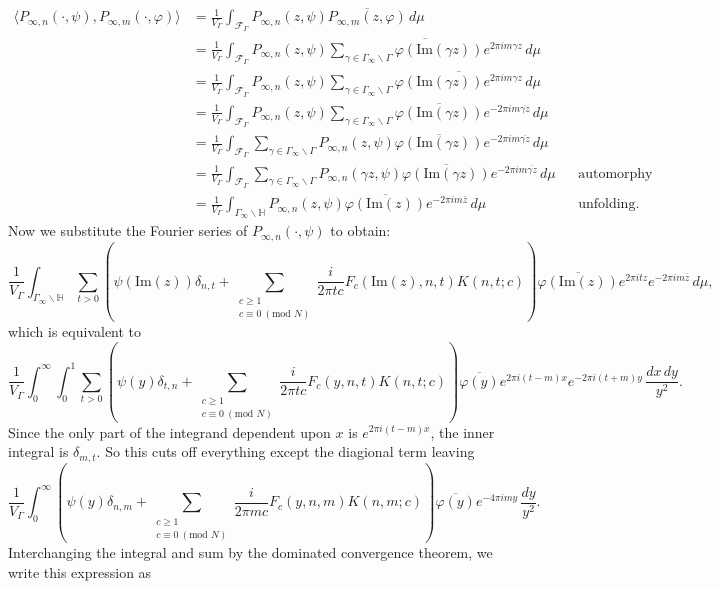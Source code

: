 \documentclass[12pt]{book}
\theoremstyle{definition}\newframedtheorem{method}{Method}
\newcommand{\tmod}[1]{\ \left(\text{mod }#1\right)}
\newcommand{\mc}{\mathcal}
\renewcommand{\H}{\mathbb{H}}
\newcommand{\g}{\gamma}
\renewcommand{\d}{\delta}
\newcommand{\G}{\Gamma}
\newcommand{\vphi}{\varphi}
\newcommand{\<}{\langle}
\renewcommand{\>}{\rangle}
\newcommand{\conj}{\overline}
\renewcommand{\Im}{\mathrm{Im}}
\newcommand{\GG}{\G_{\infty}\backslash\G}
\begin{document}
      \begin{align*}
        \<P_{\infty,n}(\cdot,\psi),P_{\infty,m}(\cdot,\vphi)\> &= \frac{1}{V_{\G}}\int_{\mc{F}_{\G}}P_{\infty,n}(z,\psi)\conj{P_{\infty,m}(z,\vphi)}\,d\mu \\
        &= \frac{1}{V_{\G}}\int_{\mc{F}_{\G}}P_{\infty,n}(z,\psi)\conj{\sum_{\g \in \GG}\vphi(\Im(\g z))e^{2\pi im\g z}}\,d\mu \\
        &= \frac{1}{V_{\G}}\int_{\mc{F}_{\G}}P_{\infty,n}(z,\psi)\sum_{\g \in \GG}\conj{\vphi(\Im(\g z))e^{2\pi im\g z}}\,d\mu \\
        &= \frac{1}{V_{\G}}\int_{\mc{F}_{\G}}P_{\infty,n}(z,\psi)\sum_{\g \in \GG}\conj{\vphi(\Im(\g z))}e^{-2\pi im\conj{\g z}}\,d\mu \\
        &= \frac{1}{V_{\G}}\int_{\mc{F}_{\G}}\sum_{\g \in \GG}P_{\infty,n}(z,\psi)\conj{\vphi(\Im(\g z))}e^{-2\pi im\conj{\g z}}\,d\mu \\
        &= \frac{1}{V_{\G}}\int_{\mc{F}_{\G}}\sum_{\g \in \GG}P_{\infty,n}(\g z,\psi)\conj{\vphi(\Im(\g z))}e^{-2\pi im\conj{\g z}}\,d\mu && \text{automorphy} \\
        &= \frac{1}{V_{\G}}\int_{\G_{\infty}\backslash\H}P_{\infty,n}(z,\psi)\conj{\vphi(\Im(z))}e^{-2\pi im\conj{z}}\,d\mu && \text{unfolding}.
      \end{align*}
      Now we substitute the Fourier series of $P_{\infty,n}(\cdot,\psi)$ to obtain:
      \[
        \frac{1}{V_{\G}}\int_{\G_{\infty}\backslash\H}\sum_{t > 0}\left(\psi(\Im(z))\d_{n,t}+\sum_{\substack{c \ge 1 \\ c \equiv 0 \tmod{N}}}\frac{i}{2\pi tc}F_{c}(\Im(z),n,t)K(n,t;c)\right)\conj{\vphi(\Im(z))}e^{2\pi itz}e^{-2\pi im\conj{z}}\,d\mu,
      \]
      which is equivalent to
      \[
        \frac{1}{V_{\G}}\int_{0}^{\infty}\int_{0}^{1}\sum_{t > 0}\left(\psi(y)\d_{t,n}+\sum_{\substack{c \ge 1 \\ c \equiv 0 \tmod{N}}}\frac{i}{2\pi tc}F_{c}(y,n,t)K(n,t;c)\right)\conj{\vphi(y)}e^{2\pi i(t-m)x}e^{-2\pi i(t+m)y}\,\frac{dx\,dy}{y^{2}}.
      \]
      Since the only part of the integrand dependent upon $x$ is $e^{2\pi i(t-m)x}$, the inner integral is $\d_{m,t}$. So this cuts off everything except the diagional term leaving
      \[
        \frac{1}{V_{\G}}\int_{0}^{\infty}\left(\psi(y)\d_{n,m}+\sum_{\substack{c \ge 1 \\ c \equiv 0 \tmod{N}}}\frac{i}{2\pi mc}F_{c}(y,n,m)K(n,m;c)\right)\conj{\vphi(y)}e^{-4\pi imy}\,\frac{dy}{y^{2}}.
      \]
      Interchanging the integral and sum by the dominated convergence theorem, we write this expression as
\end{document}
